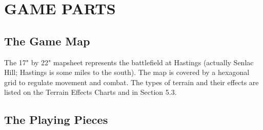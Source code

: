 \section{GAME PARTS}

\subsection{The Game Map}

The 17" by 22" mapsheet represents the battlefield at Hastings (actually Senlac Hill; Hastings is some miles to the south). The map is covered by a hexagonal grid to regulate movement and combat. The types of terrain and their effects are listed on the Terrain Effects Charts and in Section 5.3.

\subsection{The Playing Pieces}